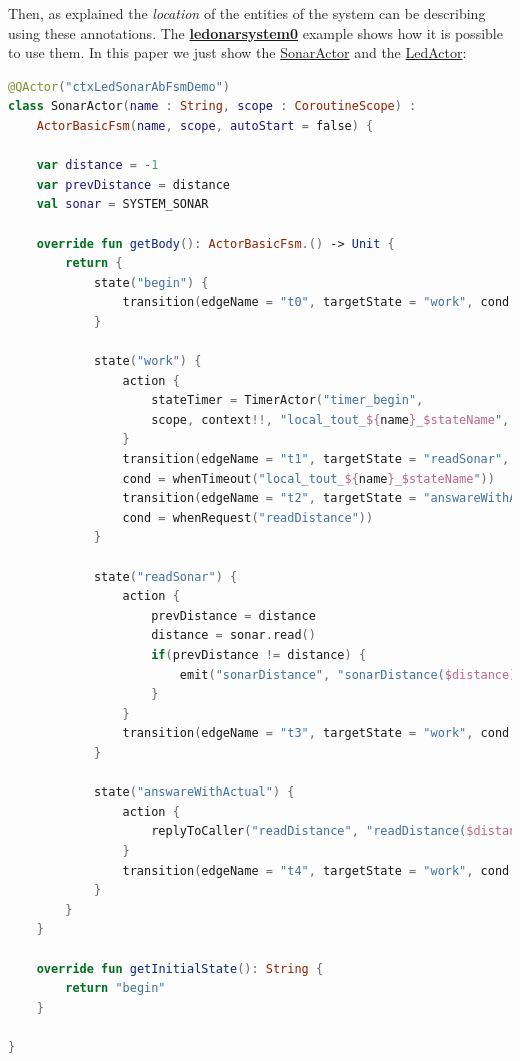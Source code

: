 Then, as explained the \textit{location} of the entities of the system can be describing using these annotations. The \href{https://github.com/LM-96/QA-Extensions/tree/main/it.unibo.ledsonardemo0}{\textcolor{Emerald}{\textbf{ledonarsystem0}}} example shows how it is possible to use them.
In this paper we just show the \href{https://github.com/LM-96/QA-Extensions/blob/main/it.unibo.ledsonardemo0/src/main/kotlin/it/unibo/ledsonardemo0/actors/SonarActor.kt}{SonarActor} and the \href{https://github.com/LM-96/QA-Extensions/blob/main/it.unibo.ledsonardemo0/src/main/kotlin/it/unibo/ledsonardemo0/actors/LedActor.kt}{LedActor}:

\begin{lstlisting}[caption=\texttt{SonarActor} (\texttt{ledsonarsystem0}),language=Kotlin]
@QActor("ctxLedSonarAbFsmDemo")
class SonarActor(name : String, scope : CoroutineScope) :
	ActorBasicFsm(name, scope, autoStart = false) {
	
	var distance = -1
	var prevDistance = distance
	val sonar = SYSTEM_SONAR
	
	override fun getBody(): ActorBasicFsm.() -> Unit {
		return {
			state("begin") {
				transition(edgeName = "t0", targetState = "work", cond = doswitch())
			}
			
			state("work") {
				action {
					stateTimer = TimerActor("timer_begin",
					scope, context!!, "local_tout_${name}_$stateName", 2000 )
				}
				transition(edgeName = "t1", targetState = "readSonar",
				cond = whenTimeout("local_tout_${name}_$stateName"))
				transition(edgeName = "t2", targetState = "answareWithActual",
				cond = whenRequest("readDistance"))
			}
			
			state("readSonar") {
				action {
					prevDistance = distance
					distance = sonar.read()
					if(prevDistance != distance) {
						emit("sonarDistance", "sonarDistance($distance)")
					}
				}
				transition(edgeName = "t3", targetState = "work", cond = doswitch())
			}
			
			state("answareWithActual") {
				action {
					replyToCaller("readDistance", "readDistance($distance)")
				}
				transition(edgeName = "t4", targetState = "work", cond = doswitch())
			}
		}
	}
	
	override fun getInitialState(): String {
		return "begin"
	}
	
}
\end{lstlisting}


